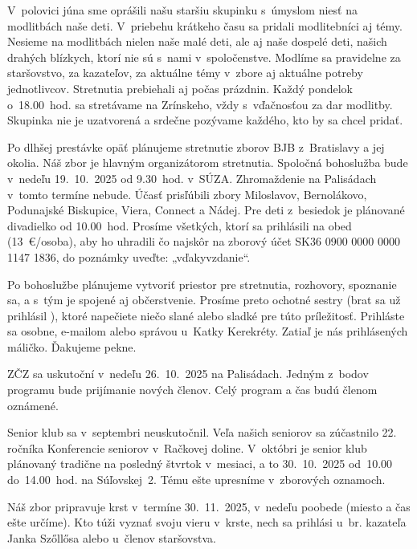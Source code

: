 V~polovici júna sme oprášili našu staršiu skupinku s~úmyslom niesť na modlitbách naše deti. V~priebehu krátkeho času sa pridali modlitebníci aj témy. Nesieme na modlitbách nielen naše malé deti, ale aj naše dospelé deti, našich drahých blízkych, ktorí nie sú s~nami v~spoločenstve. Modlíme sa pravidelne za staršovstvo, za kazateľov, za aktuálne témy v~zbore aj aktuálne potreby jednotlivcov. Stretnutia prebiehali aj počas prázdnin. Každý pondelok o~18.00~hod. sa stretávame na Zrínskeho, vždy s~vďačnosťou za dar modlitby. Skupinka nie je uzatvorená a srdečne pozývame každého, kto by sa chcel pridať.


Po dlhšej prestávke opäť plánujeme stretnutie zborov BJB z~Bratislavy a jej okolia. Náš zbor je hlavným organizátorom stretnutia.
Spoločná bohoslužba bude v~nedeľu 19.~10.~2025 od 9.30~hod. v~SÚZA.
Zhromaždenie na Palisádach v~tomto termíne nebude. Účasť prisľúbili zbory Miloslavov, Bernolákovo, Podunajské Biskupice, Viera, Connect a Nádej.
Pre deti z~besiedok je plánované divadielko od 10.00~hod.
Prosíme všetkých, ktorí sa prihlásili na obed (13~€/osoba), aby ho uhradili čo najskôr na zborový účet SK36 0900 0000 0000 1147 1836, do poznámky uveďte: „vďakyvzdanie“.

Po bohoslužbe plánujeme vytvoriť priestor pre stretnutia, rozhovory, spoznanie sa, a s~tým je spojené aj občerstvenie. Prosíme preto ochotné sestry (brat sa už prihlásil \smiley), ktoré napečiete niečo slané alebo sladké pre túto príležitosť. Prihláste sa osobne, e-mailom alebo správou u~Katky Kerekréty. Zatiaľ je nás prihlásených máličko. Ďakujeme pekne.


ZČZ sa uskutoční v~nedeľu 26.~10.~2025 na Palisádach. Jedným z~bodov programu bude prijímanie nových členov. Celý program a čas budú členom oznámené.


Senior klub sa v~septembri neuskutočnil. Veľa našich seniorov sa zúčastnilo 22. ročníka Konferencie seniorov v~Račkovej doline.
V~októbri je senior klub plánovaný tradične na posledný štvrtok v~mesiaci, a to 30.~10.~2025 od~10.00 do~14.00~hod. na Súľovskej~2. Tému ešte upresníme v~zborových oznamoch.


Náš zbor pripravuje krst v~termíne 30.~11.~2025, v~nedeľu poobede (miesto a čas ešte určíme). Kto túži vyznať svoju vieru v~krste, nech sa prihlási u~br. kazateľa Janka Szőllősa alebo u~členov staršovstva.


